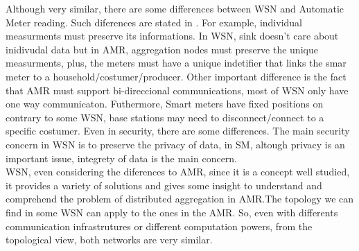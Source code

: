 Although very similar, there are some differences between WSN and Automatic Meter reading. Such diferences are stated in \cite{khalifa2011survey}. For example, individual measurments must preserve its informations. In WSN, sink doesn't care about inidivudal data but in AMR, aggregation nodes must preserve the unique measurments, plus, the meters must have a unique indetifier that links the smar meter to a household/costumer/producer. Other  important difference is the fact that AMR must support bi-direccional communications, most of WSN only have one way communicaton. Futhermore, Smart meters have fixed positions on contrary to some WSN, base stations may need to disconnect/connect to a specific costumer. Even in security, there are some differences. The main security concern in WSN is to preserve the privacy of data, in SM, altough privacy is an important issue, integrety of data is the main concern.\\
WSN, even considering the diferences to AMR,  since it is a concept well studied, it provides a variety of solutions and gives some insight to understand and comprehend the problem of distributed aggregation in AMR.The topology we can find in some WSN can apply to the ones in the AMR. So, even with differents communication infrastrutures or different computation powers,  from the topological view, both networks are very similar.\\

